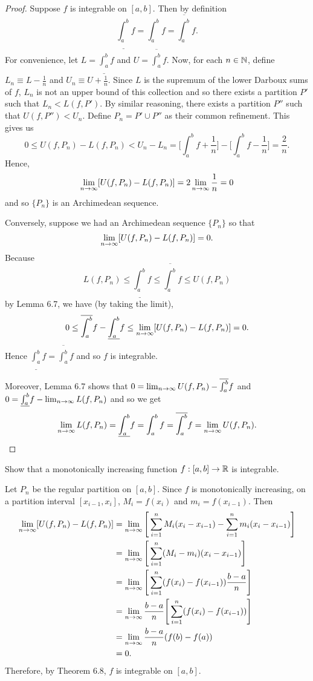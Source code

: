 \documentclass[letterpaper, twoside, 12pt]{book}
\begin{document}
\begin{proof}
    Suppose \(f\) is integrable on \([a,b]\). Then by definition
    \[ \underline{\int_a^b} f = \int_a^b f = \overline{\int_a^b} f .\]
    For convenience, let \(L = \underline{\int_a^b} f\) and
    \(U = \overline{\int_a^b} f\). Now, for each \(n \in \mathbb N\), 
    define \(L_n \equiv L - \frac{1}{n}\) and \(U_n \equiv U + \frac{1}{n}\).
    Since \(L\) is the supremum of the lower Darboux sums of \(f\),
    \(L_n\) is not an upper bound of this collection and so there
    exists a partition \(P'\) such that \(L_n < L(f, P')\). By similar
    reasoning, there exists a partition \(P''\) such that
    \(U(f, P'') < U_n \). Define \(P_n = P' \cup P''\) as their common
    refinement. This gives us
    \[ 0 \leq U(f, P_n) - L(f, P_n) < U_n - L_n = 
        \Bigg [ \int_a^b f + \frac{1}{n} \Bigg ] - 
        \Bigg [ \int_a^b f - \frac{1}{n} \Bigg ] = \frac{2}{n}. \]
    Hence,
    \[ \lim_{n \to \infty} [ U(f, P_n) - L(f, P_n) ] = 2 \lim_{n \to \infty} \frac{1}{n} = 0 \]
    and so \(\{P_n\}\) is an Archimedean sequence. 


    Conversely, suppose we had an Archimedean sequence \(\{P_n\}\) so that 
    \[ \lim_{n \to \infty} [ U(f, P_n) - L(f, P_n) ] = 0 .\]
    Because 
    \[L(f, P_n) \leq \underline{\int_a^b} f \leq \overline{\int_a^b} f \leq U(f, P_n) \]
    by Lemma 6.7, we have (by taking the limit), 
    \[ 0 \leq \overline{\int_a^b} f - \underline{\int_a^b} f \leq \lim_{n \to \infty} [U(f, P_n) - L(f, P_n)] = 0 .\]
    Hence \(\underline{\int_a^b} f = \overline{\int_a^b} f \) and so \(f\)
    is integrable.

    Moreover, Lemma 6.7 shows that \( 0 = \lim_{n \to \infty} U(f, P_n) - \overline{\int_a^b} f \)
    and \(0 = \underline{\int_a^b} f - \lim_{n \to \infty} L(f, P_n) \) and so we get
    \[ \lim_{n \to \infty} L(f, P_n) = \underline{\int_a^b} f = \int_a^b f = \overline{\int_a^b} f = \lim_{n \to \infty} U(f, P_n) .\]
\end{proof}


\begin{example}[6.9]
  Show that
  a monotonically increasing function \(f:[a,b]\to\mathbb R\) is integrable.
\end{example}

\begin{solution}
    Let \(P_n\) be the regular partition on \([a,b]\). Since \(f\) is 
    monotonically increasing, on a partition interval \([x_{i-1}, x_i]\),
    \(M_i = f(x_{i})\) and \(m_i = f(x_{i-1})\). Then
    \begin{align*}
        \lim_{n \to \infty} [U(f, P_n) - L(f, P_n)] &= \lim_{n \to \infty} \Bigg [ \sum_{i = 1}^n M_{i}(x_i - x_{i-1}) - \sum_{i = 1}^n m_i (x_i - x_{i-1}) \Bigg ]\\
            &= \lim_{n \to \infty} \Bigg [ \sum_{i = 1}^n (M_i - m_i)(x_i - x_{i-1}) \Bigg ] \\
            &= \lim_{n \to \infty} \Bigg [ \sum_{i = 1}^n (f(x_i) - f(x_{i-1})) \frac{b - a}{n} \Bigg ] \\
            &= \lim_{n \to \infty} \frac{b - a}{n} \Bigg [ \sum_{i = 1}^n (f(x_i) - f(x_{i-1})) \Bigg ] \\
            &= \lim_{n \to \infty} \frac{b - a}{n} (f(b) - f(a)) \\
            &= 0.
    \end{align*}
    Therefore, by Theorem 6.8, \(f\) is integrable on \([a,b]\).
\end{solution}
\end{document}
